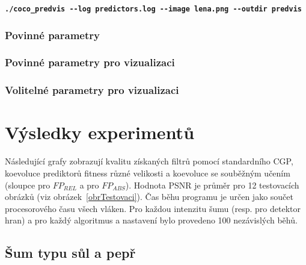 \baselineskip
\textbf{\texttt{./coco\_predvis -{}-log predictors.log -{}-image lena.png -{}-outdir predvis}}

\subsection*{Povinné parametry}


\subsection*{Povinné parametry pro vizualizaci}


\subsection*{Volitelné parametry pro vizualizaci}


\chapter{Výsledky experimentů}
\label{apxResults}

Následující grafy zobrazují kvalitu získaných filtrů pomocí standardního CGP, koevoluce prediktorů fitness různé velikosti a koevoluce se souběžným učením (sloupce  pro $\mathit{FP_{REL}}$ a  pro $\mathit{FP_{ABS}}$). Hodnota PSNR je průměr pro 12 testovacích obrázků (viz obrázek~\ref{obrTestovaci}). Čas běhu programu je určen jako součet procesorového času všech vláken. Pro každou intenzitu šumu (resp. pro detektor hran) a pro každý algoritmus a nastavení bylo provedeno 100 nezávislých běhů.

\section{Šum typu sůl a pepř}

